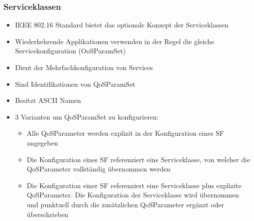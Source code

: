 \subsubsection{Serviceklassen}
\begin{itemize}
\item IEEE 802.16 Standard bietet das optionale Konzept der Serviceklassen
\item Wiederkehrende Applikationen verwenden in der Regel die gleiche Servicekonfiguration (OoSParamSet)
\item Dient der Mehrfachkonfiguration von Services
\item Sind Identifikationen von QoSParamSet
\item Besitzt ASCII Namen
\item 3 Varianten um QoSParamSet zu konfigurieren:
\begin{itemize}
\item Alle QoSParameter werden explizit in der Konfiguration eines SF angegeben
\item Die Konfiguration eines SF referenziert eine Serviceklasse, von welcher die QoSParameter vollständig übernommen werden
\item Die Konfiguration einer SF referenziert eine Serviceklasse plus explizite QoSParameter. Die Konfiguration der Serviceklasse wird übernommen und punktuell durch die zusätzlichen QoSParameter ergänzt oder überschrieben
\end{itemize}
\end{itemize}

